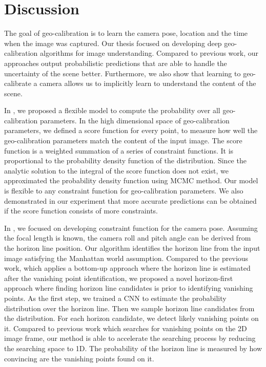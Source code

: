 \chapter{Discussion}
\label{chap:discussion}

The goal of geo-calibration is to learn the camera pose, location and
the time when the image was captured.
Our thesis focused on developing deep geo-calibration algorithms for
image understanding.
Compared to previous work, our approaches output probabilistic
predictions that are able to handle the uncertainty of the scene
better. Furthermore, we also show that
learning to geo-calibrate a camera allows us to implicitly learn to
understand the content of the scene.


In , we proposed a flexible model to compute the
probability over all geo-calibration parameters. In the high
dimensional space of geo-calibration parameters, we defined a score
function for every point, to measure how well the
geo-calibration parameters match the content of the input image.
The score function is a weighted summation of a series of
constraint functions. It is proportional to the probability density
function of the distribution. Since the analytic solution to the
integral of the score function does not exist, we approximated the
probability density function using MCMC method. Our model is flexible
to any constraint function for geo-calibration parameters. We also
demonstrated in our experiment that more accurate predictions can be
obtained if the score function consists of more constraints.

In , we focused on developing constraint function
for the camera pose. Assuming the focal length is known, the camera
roll and pitch angle can be derived from the horizon line position.
Our algorithm identifies the horizon line from the input image
satisfying the Manhattan world assumption. Compared to the previous
work, which applies a bottom-up approach where the horizon line is
estimated after the vanishing point identification, we proposed a
novel horizon-first approach where finding horizon line candidates is
prior to identifying vanishing points.  As the first step, we trained
a CNN to estimate the probability distribution over the horizon line.
Then we sample horizon line candidates from the distribution. For each
horizon candidate, we detect likely vanishing points on it. Compared
to previous work which searches for vanishing points on the 2D image
frame, our method is able to accelerate the searching process by
reducing the searching space to 1D. The probability of the horizon
line is measured by how convincing are the vanishing points found on
it. 

